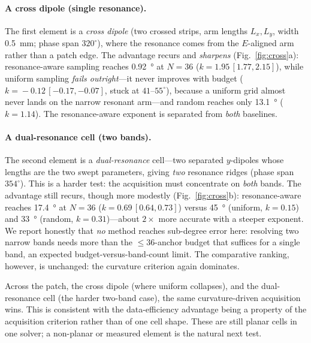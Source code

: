 \documentclass[11pt]{article}
\begin{document}
\paragraph{A cross dipole (single resonance).} The first element is a \emph{cross dipole} (two crossed
strips, arm lengths $L_x,L_y$, width \SI{0.5}{mm}; phase span $320^\circ$), where the resonance comes from
the $E$-aligned arm rather than a patch edge. The advantage recurs and \emph{sharpens}
(Fig.~\ref{fig:cross}a): resonance-aware sampling reaches \SI{0.92}{\degree} at $N\!=\!36$
($k\!=\!1.95\,[1.77,2.15]$), while uniform sampling \emph{fails outright}---it never improves with budget
($k\!=\!-0.12\,[-0.17,-0.07]$, stuck at $41$--$55^\circ$), because a uniform grid almost never lands on the
narrow resonant arm---and random reaches only \SI{13.1}{\degree} ($k\!=\!1.14$). The resonance-aware
exponent is separated from \emph{both} baselines.

\paragraph{A dual-resonance cell (two bands).} The second element is a \emph{dual-resonance} cell---two
separated $y$-dipoles whose lengths are the two swept parameters, giving \emph{two} resonance ridges
(phase span $354^\circ$). This is a harder test: the acquisition must concentrate on \emph{both} bands. The
advantage still recurs, though more modestly (Fig.~\ref{fig:cross}b): resonance-aware reaches
\SI{17.4}{\degree} at $N\!=\!36$ ($k\!=\!0.69\,[0.64,0.73]$) versus \SI{45}{\degree} (uniform,
$k\!=\!0.15$) and \SI{33}{\degree} (random, $k\!=\!0.31$)---about $2\times$ more accurate with a steeper
exponent. We report honestly that \emph{no} method reaches sub-degree error here: resolving two narrow
bands needs more than the $\le\!36$-anchor budget that suffices for a single band, an expected
budget-versus-band-count limit. The comparative ranking, however, is unchanged: the curvature criterion
again dominates.

Across the patch, the cross dipole (where uniform collapses), and the dual-resonance cell (the harder
two-band case), the same curvature-driven acquisition wins. This is consistent with the data-efficiency
advantage being a property of the acquisition criterion rather than of one cell shape. These are still
planar cells in one solver; a non-planar or measured element is the natural next test.
\end{document}
